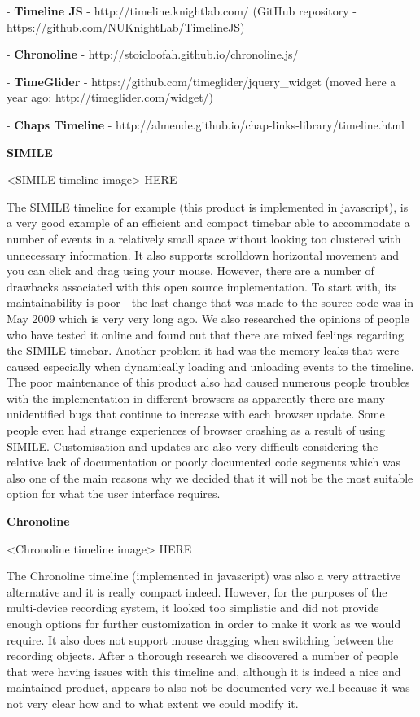 \documentclass{l3proj}
\begin{document}
- \textbf{Timeline JS} - http://timeline.knightlab.com/ (GitHub repository - https://github.com/NUKnightLab/TimelineJS)

- \textbf{Chronoline} - http://stoicloofah.github.io/chronoline.js/

- \textbf{TimeGlider} - https://github.com/timeglider/jquery_widget (moved here a year ago: http://timeglider.com/widget/)

- \textbf{Chaps Timeline} - http://almende.github.io/chap-links-library/timeline.html



\textbf{SIMILE}

<SIMILE timeline image> HERE

The SIMILE timeline for example (this product is implemented in javascript), is a very good example of an efficient and compact timebar able to accommodate a number of events in a relatively small space without looking too clustered with unnecessary information. It also supports scrolldown horizontal movement and  you can click and drag using your mouse. However, there are a number of drawbacks associated with this open source implementation. To start with, its maintainability is poor - the last change that was made to the source code was in May 2009 which is very very long ago. We also researched the opinions of people who have tested it online and found out that there are mixed feelings regarding the SIMILE timebar. Another problem it had was the memory leaks that were caused especially when dynamically loading and unloading events to the timeline. The poor maintenance of this product also had caused numerous people troubles with the implementation in different browsers as apparently there are many unidentified bugs that continue to increase with each browser update. Some people even had strange experiences of browser crashing as a result of using SIMILE. Customisation and updates are also very difficult considering the relative lack of documentation or poorly documented code segments which was also one of the main reasons why we decided that it will not be the most suitable option for what the user interface requires.


\textbf{Chronoline}

<Chronoline timeline image> HERE

The Chronoline timeline (implemented in javascript) was also a very attractive alternative and it is really compact indeed. However, for the purposes of the multi-device recording system, it looked too simplistic and did not provide enough options for further customization in order to make it work as we would require. It also does not support mouse dragging when switching between the recording objects. After a thorough research we discovered a number of people that were having issues with this timeline and, although it is indeed a nice and maintained product, appears to also not be documented very well because it was not very clear how and to what extent we could modify it.
\end{document}
